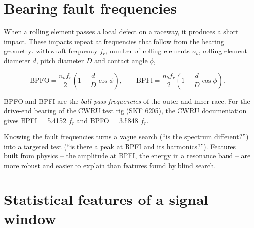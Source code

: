 \documentclass[
  letterpaper,
  DIV=11,
  numbers=noendperiod]{scrreprt}
\begin{document}
\section{Bearing fault frequencies}\label{bearing-fault-frequencies}

When a rolling element passes a local defect on a raceway, it produces a
short impact. These impacts repeat at frequencies that follow from the
bearing geometry: with shaft frequency \(f_r\), number of rolling
elements \(n_b\), rolling element diameter \(d\), pitch diameter \(D\)
and contact angle \(\phi\),

\[\text{BPFO} = \frac{n_b f_r}{2}\left(1 - \frac{d}{D}\cos\phi\right), \qquad \text{BPFI} = \frac{n_b f_r}{2}\left(1 + \frac{d}{D}\cos\phi\right).\]

BPFO and BPFI are the \emph{ball pass frequencies} of the outer and
inner race. For the drive-end bearing of the CWRU test rig (SKF 6205),
the CWRU documentation gives BPFI = 5.4152 \(f_r\) and BPFO = 3.5848
\(f_r\).

\begin{tcolorbox}[enhanced jigsaw, left=2mm, title=\textcolor{quarto-callout-tip-color}{\faLightbulb}\hspace{0.5em}{Engineering practice: let physics tell you where to look}, opacityback=0, breakable, rightrule=.15mm, arc=.35mm, toptitle=1mm, colbacktitle=quarto-callout-tip-color!10!white, opacitybacktitle=0.6, coltitle=black, colframe=quarto-callout-tip-color-frame, bottomrule=.15mm, leftrule=.75mm, bottomtitle=1mm, titlerule=0mm, toprule=.15mm, colback=white]

Knowing the fault frequencies turns a vague search (``is the spectrum
different?'') into a targeted test (``is there a peak at BPFI and its
harmonics?''). Features built from physics -- the amplitude at BPFI, the
energy in a resonance band -- are more robust and easier to explain than
features found by blind search.

\end{tcolorbox}

\section{Statistical features of a signal
window}\label{statistical-features-of-a-signal-window}
\end{document}
